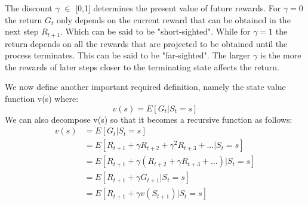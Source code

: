 The discount $\gamma$ $\in$ [0,1] determines the present value of future rewards. For $\gamma=0$ the return $G_t$ only depends on the current reward that can be obtained in the next step $R_{t+1}$. Which can be said to be "short-sighted". While for $\gamma=1$ the return depends on all the rewards that are projected to be obtained until the process terminates. This can be said to be "far-sighted". The larger $\gamma$ is the more the rewards of later steps closer to the terminating state affects the return.

We now define another important required definition, namely the state value function v(s) where:
\[v(s) = E[G_t | S_t = s]\]
We can also decompose v(s) so that it becomes a recursive function as follows:
\begin{align}
	v(s) &= E[G_t | S_t = s]\\
		 &= E[R_{t+1} + \gamma R_{t+2} + \gamma^{2} R_{t+3} + ...|S_t = s]\\
		 &= E[R_{t+1} + \gamma (R_{t+2} + \gamma R_{t+3} + ...)|S_t = s]\\
		 &= E[R_{t+1} + \gamma G_{t+1}|S_t = s]\\
		 &= E[R_{t+1} + \gamma v(S_{t+1})|S_t = s]
\end{align}